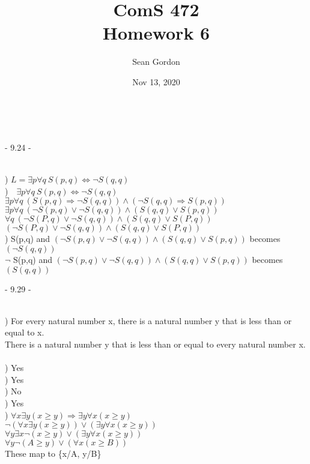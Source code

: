 \documentclass[12pt]{article}
\title{ComS 472\\Homework 6}
\author{Sean Gordon}
\date{Nov 13, 2020}
\begin{document}
\maketitle

\ \\
\centerline{- 9.24 - }
\ \\
) $L = \exists p \forall q \ S(p, q) \Leftrightarrow \neg S(q, q)$\\

)\ \  $\exists p \forall q \ S(p, q) \Leftrightarrow \neg S(q, q) $\\[.4em]
\indent $\exists p \forall q \ (S(p, q) \Rightarrow \neg S(q, q)) \wedge (\neg S(q, q) \Rightarrow S(p, q))$\\[.4em]
\indent $\exists p \forall q \ (\neg  S(p, q) \vee \neg S(q, q)) \wedge (S(q, q) \vee S(p, q))$\\[.4em]
\indent $\forall q \ (\neg  S(P, q) \vee \neg S(q, q)) \wedge (S(q, q) \vee S(P, q))$\\[.4em]
\indent $(\neg  S(P, q) \vee \neg S(q, q)) \wedge (S(q, q) \vee S(P, q))$\\

) S(p,q) and $(\neg S(p, q) \vee \neg S(q, q)) \wedge (S(q, q) \vee S(p, q))$ becomes $(\neg S(q, q))$\\[.4em]
\indent $\neg$ S(p,q) and $(\neg S(p, q) \vee \neg S(q, q)) \wedge (S(q, q) \vee S(p, q))$ becomes $(S(q, q))$\\



\noindent \hrulefill \pagebreak



\centerline{- 9.29 - }
\ \\
) For every natural number x, there is a natural number y that is less than or equal to x.\\[.4em]
\indent There is a natural number y that is less than or equal to every natural number x.\\\\
) Yes\\[.4em]
) Yes\\[.4em]
) No\\[.4em]
) Yes\\

) $\forall x \exists y (x \ge y) \Rightarrow \exists y \forall x (x \ge y)$\\[.4em]
\indent $\neg(\forall x \exists y (x \ge y)) \vee (\exists y \forall x (x \ge y))$\\[.4em]
\indent $\forall y \exists x \neg(x \ge y) \vee (\exists y \forall x (x \ge y))$\\[.4em]
\indent $\forall y \neg(A \ge y) \vee (\forall x (x \ge B))$\\[.4em]
\indent These map to \{x/A, y/B\}\\
\end{document}
